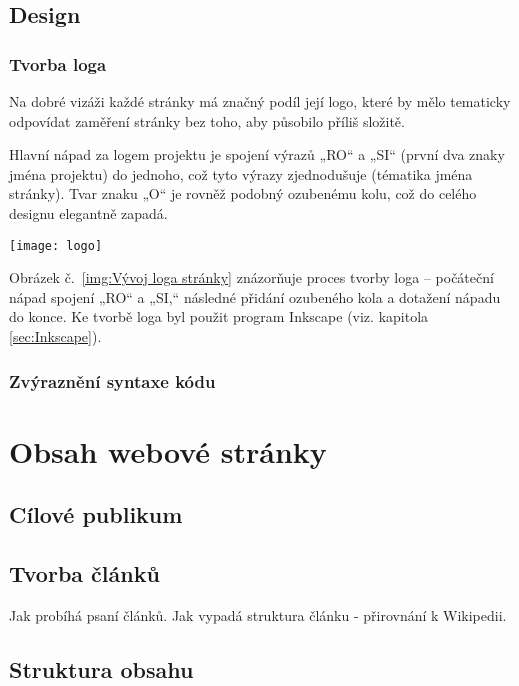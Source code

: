 \documentclass[a4paper, 12pt]{article}
\begin{document}
  \subsection{Design}

  \subsubsection{Tvorba loga}
  Na dobré vizáži každé stránky má značný podíl její logo, které by mělo tematicky odpovídat zaměření stránky bez toho, aby působilo příliš složitě.

  Hlavní nápad za logem projektu je spojení výrazů „RO“ a „SI“ (první dva znaky jména projektu) do jednoho, což tyto výrazy zjednodušuje (tématika jména stránky). Tvar znaku „O“ je rovněž podobný ozubenému kolu, což do celého designu elegantně zapadá.

  \begin{center}
    \texttt{[image: logo]}
    \label{img:Vývoj loga stránky}

  \end{center}

  Obrázek č.~\ref{img:Vývoj loga stránky} znázorňuje proces tvorby loga -- počáteční nápad spojení „RO“ a „SI,“ následné přidání ozubeného kola a dotažení nápadu do konce. Ke tvorbě loga byl použit program Inkscape (viz. kapitola \ref{sec:Inkscape}).


  \subsubsection{Zvýraznění syntaxe kódu}

  \section{Obsah webové stránky}

  \subsection{Cílové publikum}

  \subsection{Tvorba článků}
  Jak probíhá psaní článků.
  Jak vypadá struktura článku - přirovnání k Wikipedii.

  \subsection{Struktura obsahu}
\end{document}
